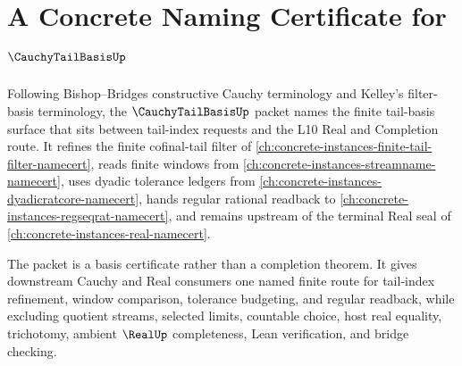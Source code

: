\chapter{A Concrete Naming Certificate for $\CauchyTailBasisUp$}
\label{ch:concrete-instances-cauchy-tail-basis-namecert}

Following Bishop--Bridges constructive Cauchy terminology and Kelley's filter-basis terminology, the $\CauchyTailBasisUp$ packet names the finite tail-basis surface that sits between tail-index requests and the L10 Real and Completion route. It refines the finite cofinal-tail filter of \autoref{ch:concrete-instances-finite-tail-filter-namecert}, reads finite windows from \autoref{ch:concrete-instances-streamname-namecert}, uses dyadic tolerance ledgers from \autoref{ch:concrete-instances-dyadicratcore-namecert}, hands regular rational readback to \autoref{ch:concrete-instances-regseqrat-namecert}, and remains upstream of the terminal Real seal of \autoref{ch:concrete-instances-real-namecert}.

The packet is a basis certificate rather than a completion theorem. It gives downstream Cauchy and Real consumers one named finite route for tail-index refinement, window comparison, tolerance budgeting, and regular readback, while excluding quotient streams, selected limits, countable choice, host real equality, trichotomy, ambient $\RealUp$ completeness, Lean verification, and bridge checking.

